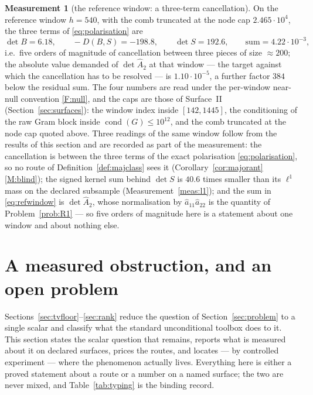\documentclass[11pt,a4paper]{article}
\theoremstyle{plain}
\theoremstyle{definition}
\newtheorem{measurement}[theorem]{Measurement}
\newcommand{\cond}{\operatorname{cond}}
\newcommand{\Ah}{\widehat{A}}
\newcommand{\ah}{\widehat{a}}
\begin{document}
\begin{measurement}[the reference window: a three-term cancellation]
\label{meas:refwindow}
On the reference window $h=540$, with the comb truncated at the node cap
$2.465\cdot10^{4}$, the three terms of \eqref{eq:polarisation} are
\begin{equation}
\label{eq:refwindow}
  \det B=6.18,
  \qquad
  -D(B,S)=-198.8,
  \qquad
  \det S=192.6,
  \qquad
  \text{sum}=4.22\cdot10^{-3},
\end{equation}
i.e.\ five orders of magnitude of cancellation between three pieces of size
$\approx200$; the absolute value demanded of $\det\Ah_2$ at that window --- the
target against which the cancellation has to be resolved --- is
$1.10\cdot10^{-5}$, a further factor $384$ below the residual sum. The four
numbers are read under the per-window near-null convention \ref{F:null}, and the
caps are those of Surface~II
(Section~\ref{sec:surfaces}): the window index inside $[142,1445]$, the
conditioning of the raw Gram block inside $\cond(G)\le10^{12}$, and the comb
truncated at the node cap quoted above. Three readings of the same window follow
from the results of this section and are recorded as part of the measurement:
the cancellation is between the three terms of the exact polarisation
\eqref{eq:polarisation}, so no route of Definition~\ref{def:majclass} sees it
(Corollary~\ref{cor:majorant}\ref{M:blind}); the signed kernel sum behind
$\det S$ is $40.6$ times smaller than its $\ell^{1}$ mass on the declared
subsample
(Measurement~\ref{meas:l1}); and the sum in \eqref{eq:refwindow} is
$\det\Ah_2$, whose normalisation by $\ah_{11}\ah_{22}$ is the quantity of
Problem~\ref{prob:R1} --- so five orders of magnitude here is a statement about
one window and about nothing else.
\end{measurement}

\section{A measured obstruction, and an open problem}
\label{sec:open}

Sections~\ref{sec:tvfloor}--\ref{sec:rank} reduce the question of
Section~\ref{sec:problem} to a single scalar and classify what the standard
unconditional toolbox does to it. This section states the scalar question that
remains, reports what is measured about it on declared surfaces, prices the
routes, and locates --- by controlled experiment --- where the phenomenon
actually lives. Everything here is either a proved statement about a route or a
number on a named surface; the two are never mixed, and
Table~\ref{tab:typing} is the binding record.
\end{document}
